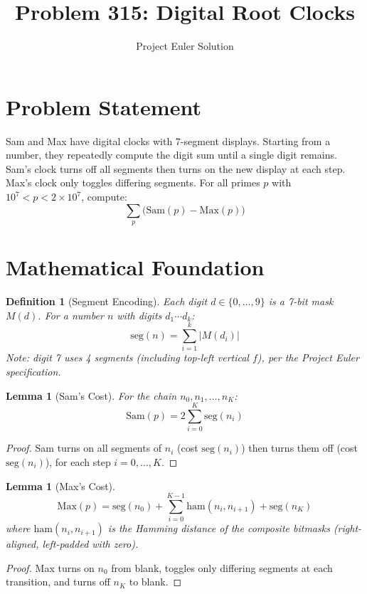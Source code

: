 \documentclass[12pt]{article}
\title{Problem 315: Digital Root Clocks}
\author{Project Euler Solution}
\date{}
\newtheorem{lemma}[theorem]{Lemma}
\newtheorem{definition}[theorem]{Definition}
\begin{document}
\maketitle

\section{Problem Statement}

Sam and Max have digital clocks with 7-segment displays. Starting from a number, they repeatedly compute the digit sum until a single digit remains. Sam's clock turns off all segments then turns on the new display at each step. Max's clock only toggles differing segments. For all primes $p$ with $10^7 < p < 2 \times 10^7$, compute:
\[
    \sum_p \bigl(\text{Sam}(p) - \text{Max}(p)\bigr)
\]

\section{Mathematical Foundation}

\begin{definition}[Segment Encoding]
Each digit $d \in \{0,\ldots,9\}$ is a 7-bit mask $M(d)$. For a number $n$ with digits $d_1\cdots d_k$:
\[
    \text{seg}(n) = \sum_{i=1}^{k} |M(d_i)|
\]
Note: digit 7 uses 4 segments (including top-left vertical $f$), per the Project Euler specification.
\end{definition}

\begin{lemma}[Sam's Cost]
For the chain $n_0, n_1, \ldots, n_K$:
\[
    \text{Sam}(p) = 2\sum_{i=0}^{K} \text{seg}(n_i)
\]
\end{lemma}

\begin{proof}
Sam turns on all segments of $n_i$ (cost $\text{seg}(n_i)$) then turns them off (cost $\text{seg}(n_i)$), for each step $i = 0, \ldots, K$.
\end{proof}

\begin{lemma}[Max's Cost]
\[
    \text{Max}(p) = \text{seg}(n_0) + \sum_{i=0}^{K-1}\text{ham}(n_i, n_{i+1}) + \text{seg}(n_K)
\]
where $\text{ham}(n_i, n_{i+1})$ is the Hamming distance of the composite bitmasks (right-aligned, left-padded with zero).
\end{lemma}

\begin{proof}
Max turns on $n_0$ from blank, toggles only differing segments at each transition, and turns off $n_K$ to blank.
\end{proof}
\end{document}
